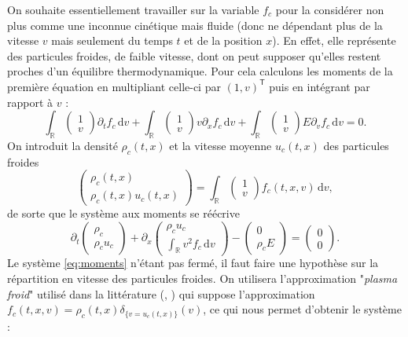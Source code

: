 On souhaite essentiellement travailler sur la variable $f_c$ pour la considérer non plus comme une inconnue cinétique mais fluide (donc ne dépendant plus de la vitesse $v$ mais seulement du temps $t$ et de la position $x$). En effet, elle représente des particules froides, de faible vitesse, dont on peut supposer qu'elles restent proches d'un équilibre thermodynamique. Pour cela calculons les moments de la première équation en multipliant celle-ci par $(1,v)^{\textsf{T}}$ puis en intégrant par rapport à $v$ :
$$
  \int_{\mathbb{R}} \begin{pmatrix}1 \\ v\end{pmatrix} \partial_tf_c\,\mathrm{d}v
  + \int_{\mathbb{R}} \begin{pmatrix}1 \\ v\end{pmatrix} v\partial_xf_c\,\mathrm{d}v
  + \int_{\mathbb{R}} \begin{pmatrix}1 \\ v\end{pmatrix} E\partial_vf_c\,\mathrm{d}v = 0. 
$$
On introduit la densité $\rho_c(t, x)$ et la vitesse moyenne $u_c(t, x)$ des particules froides
$$
\begin{pmatrix}\rho_c(t, x) \\ \rho_c(t, x) u_c(t, x)\end{pmatrix}
= 
\int_{\mathbb{R}} \begin{pmatrix}1 \\ v\end{pmatrix}f_c(t, x, v)\,\mathrm{d}v,   
$$
de sorte que le système aux moments se réécrive
\begin{equation}
  \partial_t \begin{pmatrix}\rho_c \\ \rho_c u_c \end{pmatrix}
  + \partial_x \begin{pmatrix} \rho_c u_c \\  \int_{\mathbb{R}} v^2 f_c \,\mathrm{d}v \end{pmatrix}
  - \begin{pmatrix} 0 \\ \rho_c E \end{pmatrix}
  = \begin{pmatrix} 0 \\ 0 \end{pmatrix}.
\label{eq:moments}
\end{equation}
Le système \eqref{eq:moments} n'étant pas fermé, il faut faire une hypothèse sur la répartition en vitesse des particules froides. On utilisera l'approximation "\emph{plasma froid}" utilisé dans la littérature (\cite{Tronci:2014}, \cite{Holderied:2019}) qui suppose l'approximation $f_c(t,x,v) = \rho_c(t,x)\delta_{\{v=u_c(t,x)\}}(v)$, ce qui nous permet d'obtenir le système :
